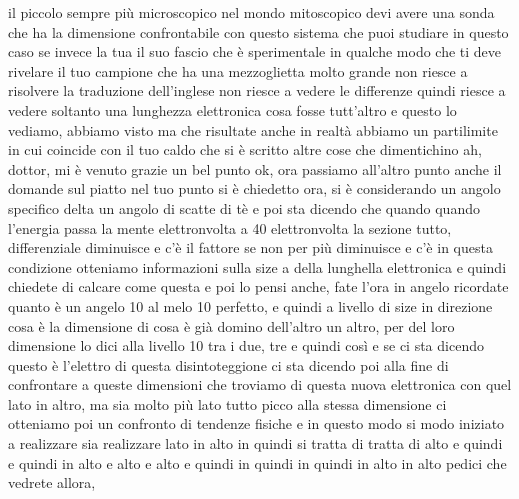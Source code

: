 \begin{soluzione}
   il piccolo sempre più microscopico nel mondo mitoscopico devi avere una sonda che ha la dimensione confrontabile con questo sistema che puoi studiare in questo caso se invece la tua il suo fascio che è sperimentale in qualche modo che ti deve rivelare il tuo campione che ha una mezzoglietta molto grande non riesce a risolvere la traduzione dell'inglese non riesce a vedere le differenze quindi riesce a vedere soltanto una lunghezza elettronica cosa fosse tutt'altro e questo lo vediamo, abbiamo visto ma che risultate anche in realtà abbiamo un partilimite in cui coincide con il tuo caldo che si è scritto altre cose che dimentichino ah, dottor, mi è venuto grazie un bel punto ok, ora passiamo all'altro punto anche il domande sul piatto nel tuo punto si è chiedetto ora, si è considerando un angolo specifico delta un angolo di scatte di tè e poi sta dicendo che quando quando l'energia passa la mente elettronvolta a 40 elettronvolta la sezione tutto, differenziale diminuisce e c'è il fattore se non per più diminuisce e c'è in questa condizione otteniamo informazioni sulla size a della lunghella elettronica e quindi chiedete di calcare come questa e poi lo pensi anche, fate l'ora in angelo ricordate quanto è un angelo 10 al melo 10 perfetto, e quindi a livello di size in direzione cosa è la dimensione di cosa è già domino dell'altro un altro, per del loro dimensione lo dici alla livello 10 tra i due, tre e quindi così e se ci sta dicendo questo è l'elettro di questa disintoteggione ci sta dicendo poi alla fine di confrontare a queste dimensioni che troviamo di questa nuova elettronica con quel lato in altro, ma sia molto più lato tutto picco alla stessa dimensione ci otteniamo poi un confronto di tendenze fisiche e in questo modo si modo iniziato a realizzare sia realizzare lato in alto in quindi si tratta di tratta di alto e quindi e quindi in alto e alto e alto e quindi in quindi in quindi in alto in alto pedici che vedrete allora,
   

\end{soluzione}
